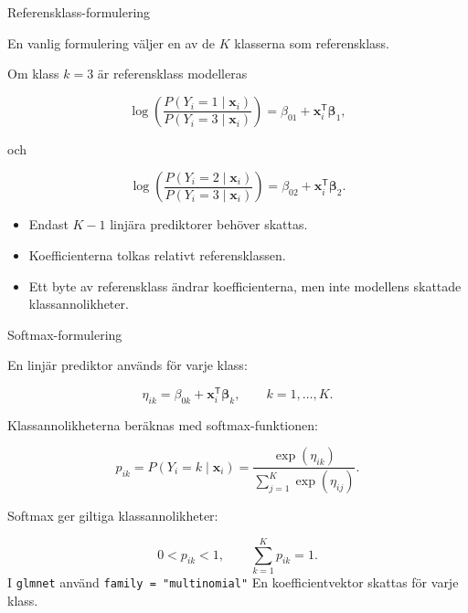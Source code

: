 \documentclass[10pt,english]{beamer}
\begin{document}
\begin{frame}{Referensklass-formulering}

    En vanlig formulering väljer en av de \(K\) klasserna som
    referensklass.

    \medskip

    Om klass \(k=3\) är referensklass modelleras

    \[
        \log
        \left(
            \frac{P(Y_i=1\mid\boldsymbol{x}_i)}
                 {P(Y_i=3\mid\boldsymbol{x}_i)}
        \right)
        =
        \beta_{01}
        +
        \boldsymbol{x}_i^{\mathsf T}\boldsymbol{\beta}_1,
    \]

    och

    \[
        \log
        \left(
            \frac{P(Y_i=2\mid\boldsymbol{x}_i)}
                 {P(Y_i=3\mid\boldsymbol{x}_i)}
        \right)
        =
        \beta_{02}
        +
        \boldsymbol{x}_i^{\mathsf T}\boldsymbol{\beta}_2.
    \]

    \begin{itemize}
        \item Endast \(K-1\) linjära prediktorer behöver skattas.
        \item Koefficienterna tolkas relativt referensklassen.
        \item Ett byte av referensklass ändrar koefficienterna, men inte
              modellens skattade klassannolikheter.
    \end{itemize}

\end{frame}


\begin{frame}{Softmax-formulering}

    En linjär prediktor används för varje klass:

    \[
        \eta_{ik}
        =
        \beta_{0k}
        +
        \boldsymbol{x}_i^{\mathsf T}\boldsymbol{\beta}_k,
        \qquad
        k=1,\ldots,K.
    \]

    Klassannolikheterna beräknas med softmax-funktionen:

    \[
        p_{ik}
        =
        P(Y_i=k\mid\boldsymbol{x}_i)
        =
        \frac{\exp(\eta_{ik})}
             {\displaystyle
              \sum_{j=1}^{K}\exp(\eta_{ij})}.
    \]

    Softmax ger giltiga klassannolikheter:

    \[
        0<p_{ik}<1,
        \qquad
        \sum_{k=1}^{K}p_{ik}=1.
    \]
  \medskip
  I \texttt{glmnet} använd \texttt{family = "multinomial"} En koefficientvektor
        skattas för varje klass.


\end{frame}
\end{document}
